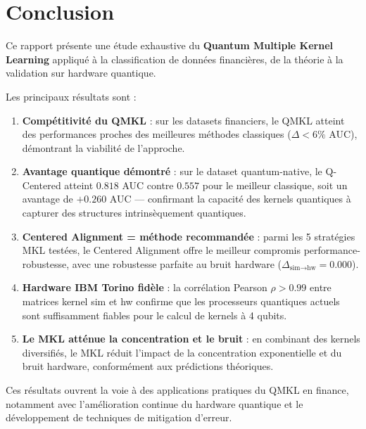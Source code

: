 \documentclass[12pt,a4paper]{article}
\begin{document}
\section{Conclusion}
\label{sec:conclusion}

Ce rapport présente une étude exhaustive du \textbf{Quantum Multiple Kernel Learning} appliqué à la classification de données financières, de la théorie à la validation sur hardware quantique.

Les principaux résultats sont :

\begin{enumerate}
    \item \textbf{Compétitivité du QMKL} : sur les datasets financiers, le QMKL atteint des performances proches des meilleures méthodes classiques ($\Delta < 6\%$ AUC), démontrant la viabilité de l'approche.

    \item \textbf{Avantage quantique démontré} : sur le dataset quantum-native, le Q-Centered atteint $0.818$ AUC contre $0.557$ pour le meilleur classique, soit un avantage de $+0.260$ AUC --- confirmant la capacité des kernels quantiques à capturer des structures intrinsèquement quantiques.

    \item \textbf{Centered Alignment = méthode recommandée} : parmi les 5 stratégies MKL testées, le Centered Alignment offre le meilleur compromis performance-robustesse, avec une robustesse parfaite au bruit hardware ($\Delta_{\text{sim}\to\text{hw}} = 0.000$).

    \item \textbf{Hardware IBM Torino fidèle} : la corrélation Pearson $\rho > 0.99$ entre matrices kernel sim et hw confirme que les processeurs quantiques actuels sont suffisamment fiables pour le calcul de kernels à 4 qubits.

    \item \textbf{Le MKL atténue la concentration et le bruit} : en combinant des kernels diversifiés, le MKL réduit l'impact de la concentration exponentielle et du bruit hardware, conformément aux prédictions théoriques.
\end{enumerate}

Ces résultats ouvrent la voie à des applications pratiques du QMKL en finance, notamment avec l'amélioration continue du hardware quantique et le développement de techniques de mitigation d'erreur.
\end{document}
